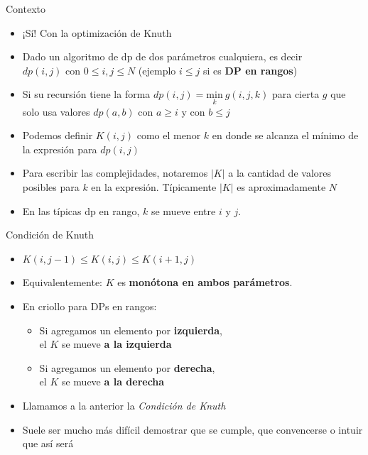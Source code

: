 \documentclass{beamer}
\begin{document}
\begin{frame}{Contexto}
    \begin{itemize}
		\item ¡Sí! Con la optimización de Knuth
		\item Dado un algoritmo de dp de dos parámetros cualquiera, es decir \\ $dp(i,j)$ con $0 \leq i, j \leq N$ (ejemplo $i \leq j$ si es \textbf{DP en rangos})
		\item Si su recursión tiene la forma $dp(i,j) = \underset{k}{\mbox{min}}{\ g(i,j, k)}$ para cierta $g$ que solo usa valores $dp(a,b)$ con $a \geq i$ y con $b \leq j$
		\item Podemos definir $K(i,j)$ como el menor $k$ en donde se alcanza el mínimo de la expresión para $dp(i,j)$
        \item Para escribir las complejidades, notaremos $|K|$ a la cantidad de valores posibles para $k$ en la expresión. Típicamente $|K|$ es aproximadamente $N$
        \item En las típicas dp en rango, $k$ se mueve entre $i$ y $j$.
    \end{itemize}
\end{frame}

\begin{frame}{Condición de Knuth}
    \begin{itemize}
		\item $K(i,j-1) \leq K(i,j) \leq K(i+1, j)$
		\item Equivalentemente: $K$ es \textbf{monótona en ambos parámetros}.  
        \item En criollo para DPs en rangos:
		  \begin{itemize}
			\item Si agregamos un elemento por \textbf{izquierda}, \\ el $K$ se mueve \textbf{a la izquierda}
			\item Si agregamos un elemento por \textbf{derecha}, \\ el $K$ se mueve \textbf{a la derecha}
		  \end{itemize}
        \item Llamamos a la anterior la \textit{Condición de Knuth}
		\item Suele ser mucho más difícil demostrar que se cumple, que convencerse o intuir que así será
    \end{itemize}
\end{frame}
\end{document}
